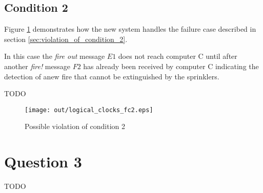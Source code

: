 \documentclass[twocolumn]{article}
\begin{document}
\subsection{Condition 2}

Figure \ref{fig:logical_clocks_fc2} demonstrates how the new system handles the
failure case described in section \ref{sec:violation_of_condition_2}.

In this case the \textit{fire out} message $E1$ does not reach computer C until
after another \textit{fire!} message $F2$ has already been received by computer
C indicating the detection of anew fire that cannot be extinguished by the
sprinklers.

TODO

\begin{figure}[h!]
  \centering
  \texttt{[image: out/logical\_clocks\_fc2.eps]}
  \caption{Possible violation of condition 2}
  \label{fig:logical_clocks_fc2}
\end{figure}

\section{Question 3}

TODO
\end{document}
